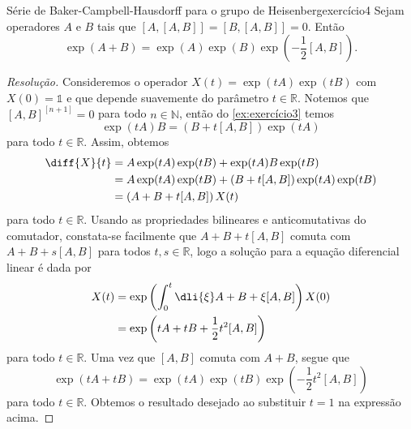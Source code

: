 \begin{exercício}{Série de Baker-Campbell-Hausdorff para o grupo de Heisenberg}{exercício4}
    Sejam operadores \(A\) e \(B\) tais que \([A,[A,B]] = [B,[A,B]] = 0\). Então
    \begin{equation*}
        \exp(A + B) = \exp(A) \exp(B) \exp\left(-\frac12 [A, B]\right).
    \end{equation*}
\end{exercício}
\begin{proof}[Resolução]
    Consideremos o operador \(X(t) = \exp(tA)\exp(tB)\) com \(X(0) = \mathds{1}\) e que depende suavemente do parâmetro \(t \in \mathbb{R}\). Notemos que \([A, B]^{[n+1]} = 0\) para todo \(n \in \mathbb{N}\), então do \cref{ex:exercício3} temos
    \begin{equation*}
        \exp(tA) B = \left(B + t[A,B]\right)\exp(tA)
    \end{equation*}
    para todo \(t \in \mathbb{R}\). Assim, obtemos
    \begin{align*}
        \diff{X}{t} &= A \exp(tA)\exp(tB) + \exp(tA) B \exp(tB)\\
                    &= A \exp(tA) \exp(tB) + \left(B + t[A,B]\right)\exp(tA)\exp(tB)\\
                    &= \left(A + B + t[A,B]\right)X(t)
    \end{align*}
    para todo \(t \in \mathbb{R}\). Usando as propriedades bilineares e anticomutativas do comutador, constata-se facilmente que \(A + B + t[A,B]\) comuta com \(A + B + s[A,B]\) para todos \(t, s \in \mathbb{R}\), logo a solução para a equação diferencial linear é dada por
    \begin{align*}
        X(t) &= \exp\left(\int_{0}^{t}\dli{\xi} A + B + \xi [A,B]\right)X(0)\\
             &= \exp\left(tA + tB + \frac12 t^2 [A,B]\right)
    \end{align*}
    para todo \(t \in \mathbb{R}\). Uma vez que \([A,B]\) comuta com \(A + B\), segue que
    \begin{equation*}
        \exp(tA + tB) = \exp(tA)\exp(tB)\exp\left(-\frac12t^2[A,B]\right)
    \end{equation*}
    para todo \(t \in \mathbb{R}\). Obtemos o resultado desejado ao substituir \(t = 1\) na expressão acima.
\end{proof}
